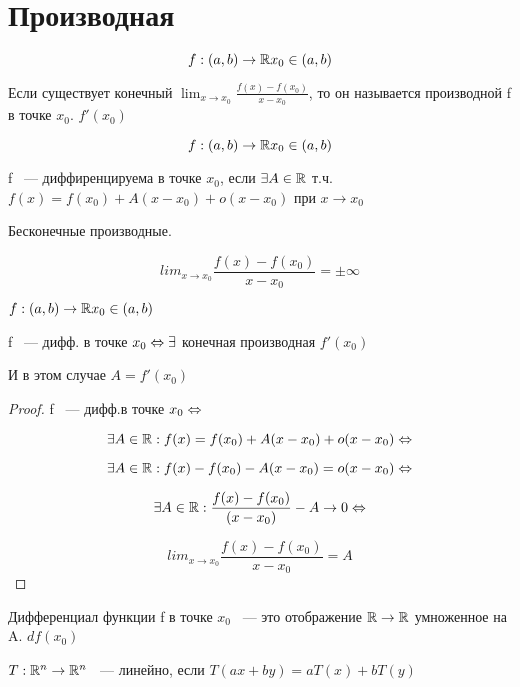 ﻿\section{Производная}

\begin{Def}
 $$f:(a, b)\to \mathbb{R} x_0 \in (a, b)$$

 Если существует конечный $\lim_{x \to x_0} \frac{f(x) - f(x_0)}{x - x_0}$, то он называется производной f в точке $x_0$. $f'(x_0)$
\end{Def}

\begin{Def}
$$f:(a, b) \to \mathbb{R} x_0 \in (a, b)$$

f ~--- диффиренцируема в точке $x_0$, если $\exists A \in \mathbb{R}$ т.ч. $f(x) = f(x_0) + A(x - x_0) + o(x - x_0)$ при $x \to x_0$
\end{Def}

\begin{Rem}
 Бесконечные производные. 

 $$ lim_{x \to x_0}\frac{f(x) - f(x_0)}{x - x_0} = \pm \infty$$
\end{Rem}

\begin{theorem}{}
$f:(a, b) \to \mathbb{R} x_0 \in (a, b)$

f ~--- дифф. в точке $x_0 \Leftrightarrow \exists$ конечная производная $f'(x_0)$

И в этом случае $A = f'(x_0)$ 
\end{theorem}

\begin{proof}
 f ~--- дифф.в точке $x_0 \Leftrightarrow$

 $$\exists A \in \mathbb{R}: f(x) = f(x_0) + A(x - x_0) + o(x - x_0) \Leftrightarrow $$

 $$\exists A \in \mathbb{R}: f(x) - f(x_0) - A(x - x_0) = o(x - x_0) \Leftrightarrow $$

 $$\exists A \in \mathbb{R}: \frac{f(x) - f(x_0)}{(x - x_0)} - A \to 0 \Leftrightarrow $$

 $$lim_{x \to x_0} \frac{f(x) - f(x_0)}{x - x_0} = A$$
\end{proof}

\begin{Def}
 Дифференциал функции f в точке $x_0$ ~--- это отображение $\mathbb{R} \to \mathbb{R}$ умноженное на A. $df(x_0)$
\end{Def}

$T:\mathbb{R}^n \to \mathbb{R}^n$ ~--- линейно, если $T(ax + by) = aT(x) + bT(y)$